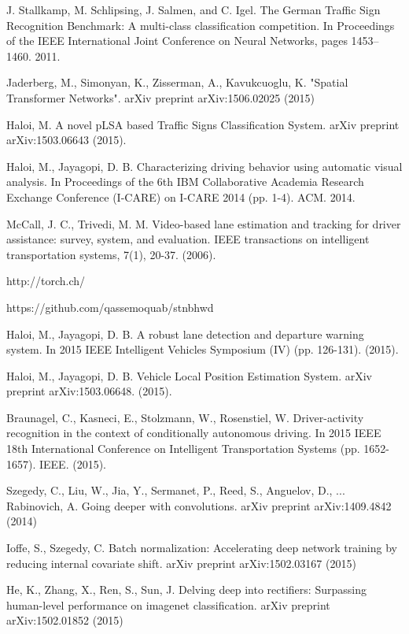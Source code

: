 \documentclass[conference]{IEEEtran}
\begin{document}
\begin{thebibliography}{1}

 J. Stallkamp, M. Schlipsing, J. Salmen, and C. Igel. The German Traffic Sign Recognition Benchmark: A multi-class classification competition. In Proceedings of the IEEE International Joint Conference on Neural Networks, pages 1453–1460. 2011. 

 Jaderberg, M., Simonyan, K., Zisserman, A., Kavukcuoglu, K. "Spatial Transformer Networks". arXiv preprint arXiv:1506.02025 (2015)

 Haloi, M. A novel pLSA based Traffic Signs Classification System. arXiv preprint arXiv:1503.06643 (2015).

 Haloi, M., Jayagopi, D. B. Characterizing driving behavior using automatic visual analysis. In Proceedings of the 6th IBM Collaborative Academia Research Exchange Conference (I-CARE) on I-CARE 2014 (pp. 1-4). ACM. 2014.

 McCall, J. C.,  Trivedi, M. M. Video-based lane estimation and tracking for driver assistance: survey, system, and evaluation. IEEE transactions on intelligent transportation systems, 7(1), 20-37. (2006).

 http://torch.ch/

 https://github.com/qassemoquab/stnbhwd

Haloi, M.,  Jayagopi, D. B. A robust lane detection and departure warning system. In 2015 IEEE Intelligent Vehicles Symposium (IV) (pp. 126-131). (2015).

 Haloi, M.,  Jayagopi, D. B. Vehicle Local Position Estimation System. arXiv preprint arXiv:1503.06648. (2015).

Braunagel, C., Kasneci, E., Stolzmann, W.,  Rosenstiel, W. Driver-activity recognition in the context of conditionally autonomous driving. In 2015 IEEE 18th International Conference on Intelligent Transportation Systems (pp. 1652-1657). IEEE. (2015).

Szegedy, C., Liu, W., Jia, Y., Sermanet, P., Reed, S., Anguelov, D., ... Rabinovich, A. Going deeper with convolutions. arXiv preprint arXiv:1409.4842 (2014)

 Ioffe, S., Szegedy, C. Batch normalization: Accelerating deep network training by reducing internal covariate shift. arXiv preprint arXiv:1502.03167 (2015)

 He, K., Zhang, X., Ren, S., Sun, J. Delving deep into rectifiers: Surpassing human-level performance on imagenet classification. arXiv preprint arXiv:1502.01852 (2015)


\end{thebibliography}
\end{document}
